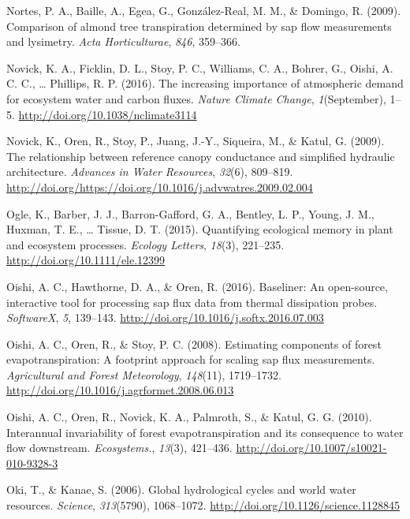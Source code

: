 \documentclass[11pt,twoside]{reedthesis}
\begin{document}
\hypertarget{ref-Nortes2009}{}
Nortes, P. A., Baille, A., Egea, G., González-Real, M. M., \& Domingo,
R. (2009). Comparison of almond tree transpiration determined by sap
flow measurements and lysimetry. \emph{Acta Horticulturae}, \emph{846},
359--366.

\hypertarget{ref-Novick2016}{}
Novick, K. A., Ficklin, D. L., Stoy, P. C., Williams, C. A., Bohrer, G.,
Oishi, A. C. C., \ldots{} Phillips, R. P. (2016). The increasing
importance of atmospheric demand for ecosystem water and carbon fluxes.
\emph{Nature Climate Change}, \emph{1}(September), 1--5.
\url{http://doi.org/10.1038/nclimate3114}

\hypertarget{ref-Novick2009}{}
Novick, K., Oren, R., Stoy, P., Juang, J.-Y., Siqueira, M., \& Katul, G.
(2009). The relationship between reference canopy conductance and
simplified hydraulic architecture. \emph{Advances in Water Resources},
\emph{32}(6), 809--819.
\url{http://doi.org/https://doi.org/10.1016/j.advwatres.2009.02.004}

\hypertarget{ref-ogle_quantifying_2015}{}
Ogle, K., Barber, J. J., Barron-Gafford, G. A., Bentley, L. P., Young,
J. M., Huxman, T. E., \ldots{} Tissue, D. T. (2015). Quantifying
ecological memory in plant and ecosystem processes. \emph{Ecology
Letters}, \emph{18}(3), 221--235. \url{http://doi.org/10.1111/ele.12399}

\hypertarget{ref-Oishi2016}{}
Oishi, A. C., Hawthorne, D. A., \& Oren, R. (2016). Baseliner: An
open-source, interactive tool for processing sap flux data from thermal
dissipation probes. \emph{SoftwareX}, \emph{5}, 139--143.
\url{http://doi.org/10.1016/j.softx.2016.07.003}

\hypertarget{ref-Oishi2008}{}
Oishi, A. C., Oren, R., \& Stoy, P. C. (2008). Estimating components of
forest evapotranspiration: A footprint approach for scaling sap flux
measurements. \emph{Agricultural and Forest Meteorology},
\emph{148}(11), 1719--1732.
\url{http://doi.org/10.1016/j.agrformet.2008.06.013}

\hypertarget{ref-Oishi2010}{}
Oishi, A. C., Oren, R., Novick, K. A., Palmroth, S., \& Katul, G. G.
(2010). Interannual invariability of forest evapotranspiration and its
consequence to water flow downstream. \emph{Ecosystems.}, \emph{13}(3),
421--436. \url{http://doi.org/10.1007/s10021-010-9328-3}

\hypertarget{ref-Oki2006}{}
Oki, T., \& Kanae, S. (2006). Global hydrological cycles and world water
resources. \emph{Science}, \emph{313}(5790), 1068--1072.
\url{http://doi.org/10.1126/science.1128845}
\end{document}
